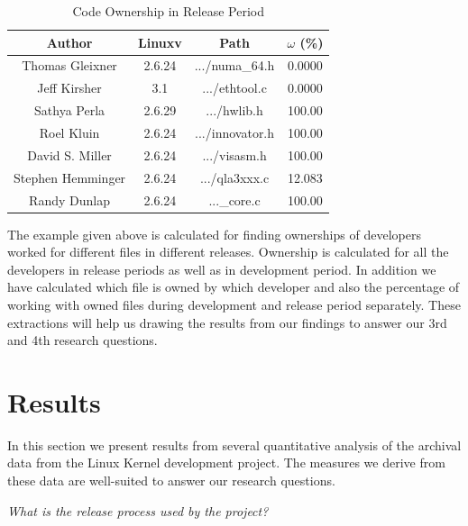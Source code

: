 \documentclass{acm_proc_article-sp}
\begin{document}
\begin{table}[ht]
\caption{Code Ownership in Release Period}  %
\centering 						%
\begin{tabular}{c c c c}				%
\hline\hline						%
Author 				& Linuxv		& Path				& $\omega$ (\%) \\ [0.5ex]
\hline 							%
Thomas Gleixner		& 2.6.24		& .../numa\_64.h		& 0.0000\\
Jeff Kirsher			& 3.1		& .../ethtool.c		& 0.0000\\
Sathya Perla			& 2.6.29		& .../hwlib.h		& 100.00\\
Roel Kluin			& 2.6.24		& .../innovator.h 	& 100.00\\
David S. Miller		& 2.6.24		& .../visasm.h 		& 100.00\\
Stephen Hemminger	& 2.6.24		& .../qla3xxx.c	 	& 12.083\\
Randy Dunlap			& 2.6.24		& ...\_core.c 		& 100.00\\
[1ex]							%
\hline 							%
\end{tabular}
\label{table:nonlin} 			%
\end{table}
The example given above is calculated for finding ownerships of developers worked for different files in different releases. Ownership is calculated for all the developers in release periods as well as in development period. In addition we have calculated which file is owned by which developer and also the percentage of working with owned files during development and release period separately. These extractions will help us drawing the results from our findings to answer our 3rd and 4th research questions.

\section{Results}
In this section we present results from several quantitative analysis of the archival data from the Linux Kernel development project. The measures we derive from these data are well-suited to answer our research questions.

\textit{What is the release process used by the project?}
\end{document}
